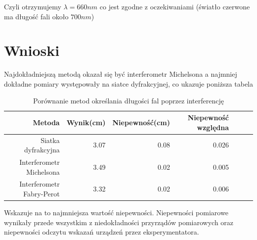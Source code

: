 \documentclass[a4paper]{article}
\begin{document}
Czyli otrzymujemy $\lambda = 660nm$ co jest zgodne z oczekiwaniami (światło czerwone ma długość fali około $700 nm$)


\section{Wnioski}
Najdokładniejszą metodą okazał się być interferometr Michelsona a najmniej dokładne pomiary występowały na siatce dyfrakcyjnej, co ukazuje poniższa tabela

\begin{table}[h!]
\centering
\begin{tabular}{rrrrrrr}
\toprule
Metoda & Wynik(cm) & Niepewność(cm) & Niepewność względna\\
\midrule
Siatka dyfrakcyjna & 3.07 & 0.08 & 0.026\\
Interferometr Michelsona & 3.49 & 0.02 & 0.005\\
Interferometr Fabry-Perot & 3.32 & 0.02 & 0.006\\
\bottomrule
\end{tabular}
\caption{Porównanie metod określania długości fal poprzez interferencję}
\label{porownanie_metod}
\end{table}

Wskazuje na to najmniejsza wartość niepewności. Niepewności pomiarowe wynikały przede
wszystkim z niedokładności przyrządów pomiarowych oraz niepewności odczytu wskazań urządzeń
przez eksperymentatora.
\end{document}
